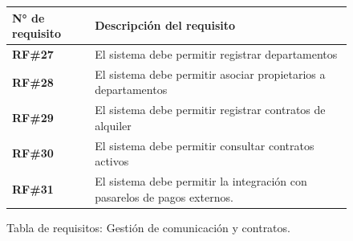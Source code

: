 \begin{figure}[H]
    \centering
    \begin{tabular}{|l|p{11cm}|}
    \hline
            \textbf{N° de requisito} 
        
        & 

            \textbf{Descripción del requisito} 
        
    \\ \hline
    
            \textbf{RF\#27} 
        
        & 

            El sistema debe permitir registrar departamentos 
        
    \\ \hline
    
            \textbf{RF\#28} 
        
        & 

            El sistema debe permitir asociar propietarios a departamentos 
        
    \\ \hline
    
            \textbf{RF\#29} 
        
        & 

            El sistema debe permitir registrar contratos de alquiler 
        
    \\ \hline
    
            \textbf{RF\#30} 
        
        & 

            El sistema debe permitir consultar contratos activos 
        
    \\ \hline
    
            \textbf{RF\#31} 
        
        & 

            El sistema debe permitir la integración con pasarelos de pagos externos. 
        
    \\ \hline
    \end{tabular}
    \caption{Tabla de requisitos: Gestión de comunicación y contratos.}
\end{figure}

